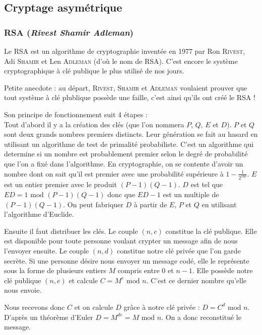 \documentclass[a4paper,12pt]{article}
\begin{document}
\subsection{Cryptage asymétrique}

\subsubsection{RSA (\emph{Rivest Shamir Adleman})}

Le RSA est un algorithme de cryptographie inventée en 1977 par  Ron \textsc{Rivest}, Adi \textsc{Shamir} et Len \textsc{Adleman} (d'où le nom de RSA). C'est encore le système cryptographique à clé publique le plus utilisé de nos jours.

Petite anecdote : au départ, \textsc{Rivest}, \textsc{Shamir} et \textsc{Adleman} voulaient prouver que tout système à clé plublique possède une faille, c'est ainsi qu'ils ont créé le RSA !

Son principe de fonctionnement suit 4 étapes :\\
Tout d'abord il y a la création des clés (que l'on nommera $P$, $Q$, $E$ et $D$). $P$ et $Q$ sont deux grands nombres premiers distincts. Leur génération se fait au hasard en utilisant un algorithme de test de primalité probabiliste. C'est un algorithme qui determine si un nombre est probablement premier selon le degré de probabilité que l'on a fixé dans l'algorithme. En cryptographie, on se \og contente \fg{} d'avoir un nombre dont on sait qu'il est premier avec une probabilité supérieure à $ 1 - \frac{1}{2^{100}} $. $E$ est un entier premier avec le produit $(P - 1)(Q - 1)$. $D$ est tel que $ED = 1 \textrm{ mod } (P - 1)(Q - 1)$ donc que $ED - 1$ est un multiple de $(P - 1)(Q - 1)$. On peut fabriquer $D$ à partir de $E$, $P$ et $Q$ en utilisant l'algorithme d'Euclide.

Ensuite il faut distribuer les clés. Le couple $(n, e)$ constitue la clé publique. Elle est disponible pour toute personne voulant crypter un message afin de nous l'envoyer ensuite. Le couple $(n, d)$ constitue notre clé privée que l'on garde secrète. Si une personne désire nous envoyer un message codé, elle le représente sous la forme de plusieurs entiers $M$ compris entre 0 et $n - 1$. Elle possède notre clé publique $(n, e)$ et calcule $C = M^{e} \textrm{ mod } n$. C'est ce dernier nombre qu'elle nous envoie.

Nous recevons donc $C$ et on calcule $D$ grâce à notre clé privée : $D = C^{d} \textrm{ mod } n$. D'après un théorème d'Euler $D = M^{de} = M \textrm{ mod } n$. On a donc reconstitué le message.
\end{document}
